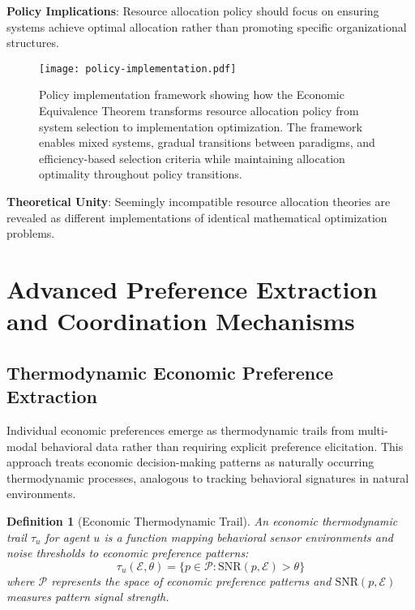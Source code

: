 \documentclass[12pt,a4paper]{article}
\newtheorem{definition}[theorem]{Definition}
\begin{document}
\textbf{Policy Implications}: Resource allocation policy should focus on ensuring systems achieve optimal allocation rather than promoting specific organizational structures.

\begin{figure}[H]
\centering
\texttt{[image: policy-implementation.pdf]}
\caption{Policy implementation framework showing how the Economic Equivalence Theorem transforms resource allocation policy from system selection to implementation optimization. The framework enables mixed systems, gradual transitions between paradigms, and efficiency-based selection criteria while maintaining allocation optimality throughout policy transitions.}
\label{fig:policy-implementation}
\end{figure}

\textbf{Theoretical Unity}: Seemingly incompatible resource allocation theories are revealed as different implementations of identical mathematical optimization problems.

\section{Advanced Preference Extraction and Coordination Mechanisms}

\subsection{Thermodynamic Economic Preference Extraction}

Individual economic preferences emerge as thermodynamic trails from multi-modal behavioral data rather than requiring explicit preference elicitation. This approach treats economic decision-making patterns as naturally occurring thermodynamic processes, analogous to tracking behavioral signatures in natural environments.

\begin{definition}[Economic Thermodynamic Trail]
An economic thermodynamic trail $\tau_u$ for agent $u$ is a function mapping behavioral sensor environments and noise thresholds to economic preference patterns:
\begin{equation}
\tau_u(\mathcal{E}, \theta) = \{p \in \mathcal{P} : \text{SNR}(p, \mathcal{E}) > \theta\}
\end{equation}
where $\mathcal{P}$ represents the space of economic preference patterns and $\text{SNR}(p, \mathcal{E})$ measures pattern signal strength.
\end{definition}
\end{document}
